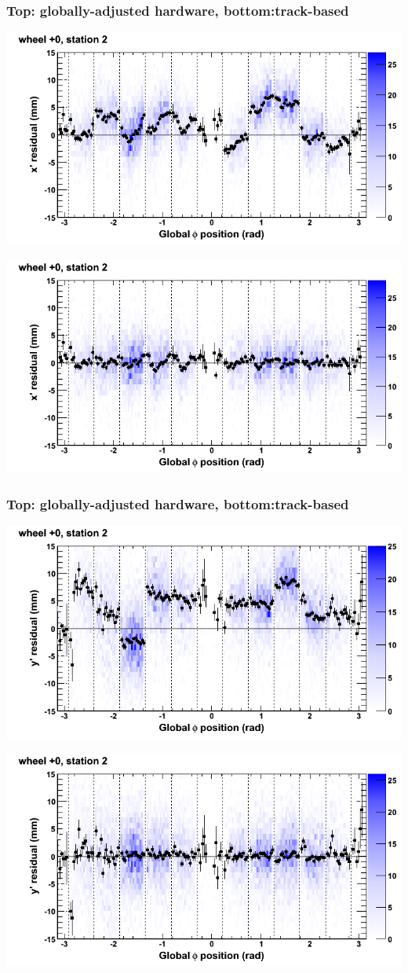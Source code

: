 \documentclass[compress]{beamer}
\begin{document}
\begin{frame}
\frametitle{Top: globally-adjusted hardware, bottom:track-based}
\includegraphics[width=0.7\linewidth]{NOV4_mapplots_HW/DTvsphi_st2whC_x.png}

\includegraphics[width=0.7\linewidth]{NOV4_mapplots/DTvsphi_st2whC_x.png}
\end{frame}

\begin{frame}
\frametitle{Top: globally-adjusted hardware, bottom:track-based}
\includegraphics[width=0.7\linewidth]{NOV4_mapplots_HW/DTvsphi_st2whC_y.png}

\includegraphics[width=0.7\linewidth]{NOV4_mapplots/DTvsphi_st2whC_y.png}
\end{frame}
\end{document}
